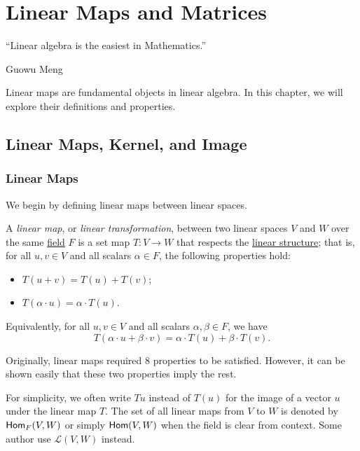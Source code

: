 \chapter{Linear Maps and Matrices}

\epigraph{``Linear algebra is the easiest in Mathematics.''}{Guowu Meng}

Linear maps are fundamental objects in linear algebra. In this chapter, we will explore their definitions and properties.

\section{Linear Maps, Kernel, and Image}

\subsection{Linear Maps}
We begin by defining linear maps between linear spaces.

\begin{definition}\label{def:linear_map}
  A \emph{linear map}, or \emph{linear transformation}, between two linear spaces $V$ and $W$ over the same \hyperref[def:field]{field} $F$ is a set map $T \colon V \to W$ that respects the \hyperref[def:linear_structure]{linear structure}; that is, for all $u, v \in V$ and all scalars $\alpha \in F$, the following properties hold:
  \begin{itemize}
    \item $T(u + v) = T(u) + T(v)$;
    \item $T(\alpha \cdot u) = \alpha \cdot T(u)$.
  \end{itemize}
  Equivalently, for all $u, v \in V$ and all scalars $\alpha, \beta \in F$, we have
  \[
    T(\alpha \cdot u + \beta \cdot v) = \alpha \cdot T(u) + \beta \cdot T(v).
  \]
\end{definition}

\begin{remark}
  Originally, linear maps required 8 properties to be satisfied. However, it can be shown easily that these two properties imply the rest.
\end{remark}

For simplicity, we often write $Tu$ instead of $T(u)$ for the image of a vector $u$ under the linear map $T$. The set of all linear maps from $V$ to $W$ is denoted by $\operatorname{\text{\normalfont\sffamily Hom}}_F(V, W)$ or simply $\operatorname{\text{\normalfont\sffamily Hom}}(V, W)$ when the field is clear from context. Some author use $\mathcal{L}(V, W)$ instead.

